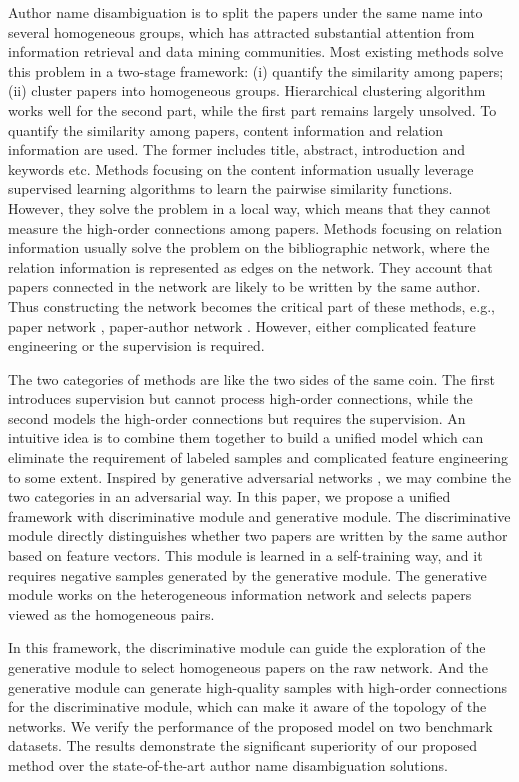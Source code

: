 \documentclass[letterpaper]{article}
\begin{document}
Author name disambiguation is to split the papers under the same name into several homogeneous groups,
which has attracted substantial attention from information retrieval and data mining communities.
Most existing methods solve this problem in a two-stage framework:
(i) quantify the similarity among papers;
(ii) cluster papers into homogeneous groups.
Hierarchical clustering algorithm works well for the second part, while the first part remains largely unsolved.
To quantify the similarity among papers, content information and relation information are used.
The former includes title, abstract, introduction and keywords etc.
Methods focusing on the content information \cite{han:2014,Huang:2006,Yoshida:2010} usually leverage supervised learning algorithms to learn the pairwise similarity functions.
However, they solve the problem in a local way, which means that they cannot measure the high-order connections among papers.
Methods focusing on relation information \cite{Kanani:2007,Bekkerman:2005} usually solve the problem on the bibliographic network, where the relation information is represented as edges on the network.
They account that papers connected in the network are likely to be written by the same author.
Thus constructing the network becomes the critical part of these methods, e.g., paper network \cite{JieTang}, paper-author network \cite{Anonymized}.
However, either complicated feature engineering or the supervision \cite{JieTang} is required.

The two categories of methods are like the two sides of the same coin.
The first introduces supervision but cannot process high-order connections, while the second models the high-order connections but requires the supervision.
An intuitive idea is to combine them together to build a unified model which can eliminate the requirement of labeled samples and complicated feature engineering to some extent.
Inspired by generative adversarial networks \cite{GAN}, we may combine the two categories in an adversarial way.
In this paper, we propose a unified framework with discriminative module and generative module.
The discriminative module directly distinguishes whether two papers are written by the same author based on feature vectors.
This module is learned in a self-training way, and it requires negative samples generated by the generative module.
The generative module works on the heterogeneous information network and selects papers viewed as the homogeneous pairs.

In this framework, the discriminative module can guide the exploration of the generative module to select homogeneous papers on the raw network.
And the generative module can generate high-quality samples with high-order connections for the discriminative module, which can make it aware of the topology of the networks.
We verify the performance of the proposed model on two benchmark datasets. The results demonstrate the significant superiority of our proposed method over the state-of-the-art author name disambiguation solutions.
\end{document}
